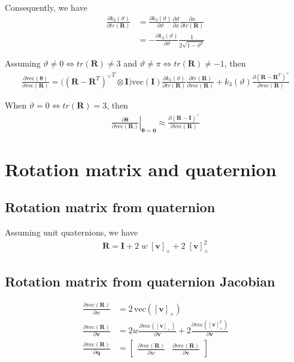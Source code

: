 \documentclass{article}
\renewcommand\aa{\bm{\theta}}
\renewcommand\t{\vartheta}
\newcommand\R{\bm{R}}
\newcommand\q{\bm{q}}
\newcommand\I{\bm{I}}
\renewcommand\v{\bm{v}}
\renewcommand\skew[1]{[#1]_{\times}}
\newcommand\vecop[1]{\text{vec} \left( #1\right)}
\begin{document}
Consequently, we have
\begin{align}
  \frac{\partial k_3(\t)}{\partial tr(\R)} 
  &=\frac{\partial k_3(\t)}{\partial \t} 
    \frac{\partial \t}{\partial x} 
    \frac{\partial x}{\partial tr(\R)} \\
  &=-\frac{\partial k_3(\t)}{\partial \t} 
    \frac{1}{2\sqrt{1-\t^2}}
\end{align}

Assuming $\t \neq 0 \iff tr(\R) \neq 3$ and $\t \neq \pi \iff tr(\R) \neq -1$, then
\begin{align}
  \frac{\partial \vecop{\aa}}{\partial \vecop{\R}} = 
    \big({(\R - \R^T)^\vee}^T \otimes \I \big)
    \vecop{\I}
    \frac{\partial k_3(\t)}{\partial tr(\R)} 
    \frac{\partial tr(\R)}{\partial \vecop{\R}} + 
    k_3(\t) \frac{\partial \left( \R - \R^T \right)^\vee}{\partial \vecop{\R}}
\end{align}

When $\t = 0 \iff tr(\R) = 3$, then 
\begin{align}
  \left. \frac{\partial \aa}{\partial \vecop{\R}} \right \vert_{\aa = \bm{0}} \approx
    \frac{\partial \left(\R - \I \right)^\vee}{\partial \vecop{\R}}
\end{align}

\section{Rotation matrix and quaternion}
\subsection{Rotation matrix from quaternion}
Assuming unit quaternions, we have
\begin{align}
  \R = \I + 2 \; w \; \skew{\v} + 2\; \skew{\v}^2
\end{align}

\subsection{Rotation matrix from quaternion Jacobian}
\begin{align}
  \frac{\partial \vecop{\R}}{\partial w} &= 2\, \vecop{\skew{\v}} \\
  \frac{\partial \vecop{\R}}{\partial \v} &= 
  2w \frac{\partial\vecop{\skew{\v}}}{\partial \v} +
  2 \frac{\partial\vecop{\skew{\v}^2}}{\partial \v} \\
  \frac{\partial \vecop{\R}}{\partial \q} &= 
    \begin{bmatrix}
      \frac{\partial \vecop{\R}}{\partial w} & 
      \frac{\partial \vecop{\R}}{\partial \v}
    \end{bmatrix}
\end{align}
\end{document}
